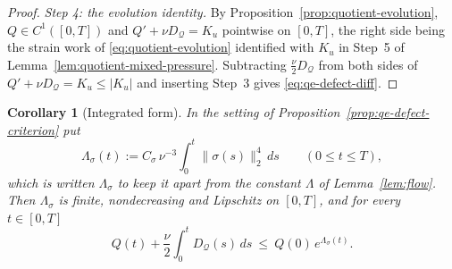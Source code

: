 \documentclass[11pt]{article}
\newtheorem{corollary}[theorem]{Corollary}
\theoremstyle{definition}
\theoremstyle{plain}
\newcommand{\norm}[1]{\lVert #1\rVert}
\begin{document}
\begin{proof}
\emph{Step 4: the evolution identity.}  By
Proposition~\ref{prop:quotient-evolution}, $Q\in C^1([0,T])$ and
$Q'+\nu D_{\mathcal Q}=K_u$ pointwise on $[0,T]$, the right side being the
strain work of \eqref{eq:quotient-evolution} identified with $K_u$ in
Step~5 of Lemma~\ref{lem:quotient-mixed-pressure}.  Subtracting
$\frac\nu2D_{\mathcal Q}$ from both sides of
$Q'+\nu D_{\mathcal Q}=K_u\le|K_u|$ and inserting Step~3 gives
\eqref{eq:qe-defect-diff}.
\end{proof}


\begin{corollary}[Integrated form]\label{cor:qe-defect-gronwall}
In the setting of Proposition~\ref{prop:qe-defect-criterion} put
\begin{equation}\label{eq:qe-Lambda}
 \Lambda_\sigma(t):=C_\sigma\,\nu^{-3}\int_0^t\norm{\sigma(s)}_2^4\,ds
 \qquad(0\le t\le T),
\end{equation}
which is written $\Lambda_\sigma$ to keep it apart from the constant
$\Lambda$ of Lemma~\ref{lem:flow}.  Then $\Lambda_\sigma$ is finite,
nondecreasing and Lipschitz on $[0,T]$, and for every $t\in[0,T]$
\begin{equation}\label{eq:qe-defect-integral}
 Q(t)+\frac\nu2\int_0^tD_{\mathcal Q}(s)\,ds
 \ \le\ Q(0)\,e^{\Lambda_\sigma(t)} .
\end{equation}
\end{corollary}
\end{document}
